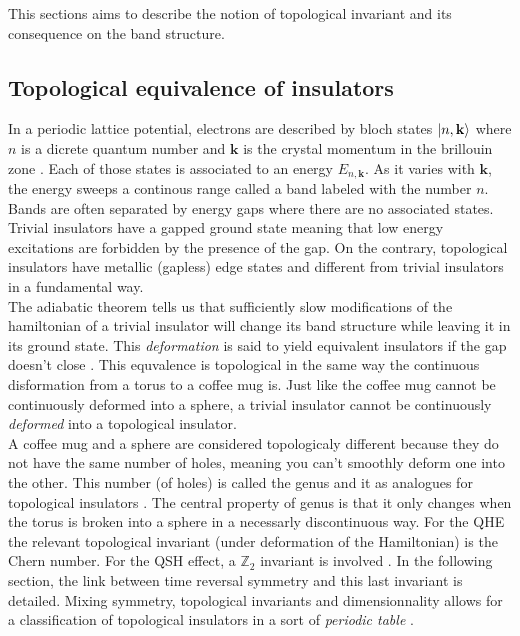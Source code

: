 This sections aims to describe the notion of topological invariant and its consequence on the band structure. 
\subsection{Topological equivalence of insulators \label{subsec:Top_Band}}
In a periodic lattice potential, electrons are described by bloch states $\ket{n, \mathbf{k}}$ where $n$ is a dicrete quantum number and $\mathbf{k}$ is the crystal momentum in the brillouin zone \cite{girvin_modern_2019}. Each of those states is associated to an energy $E_{n, \mathbf{k}}$.  As it varies with $\mathbf{k}$, the energy sweeps a continous range called a band labeled with the number $n$. Bands are often separated by energy gaps where there are no associated states. Trivial insulators have a gapped ground state meaning that low energy excitations are forbidden by the presence of the gap. On the contrary, topological insulators have metallic (gapless) edge states\cite{kane_topological_2013} and different from trivial insulators in a fundamental way.\\ 


The adiabatic theorem tells us that sufficiently slow modifications of the hamiltonian of a trivial insulator will change its band structure while leaving it in its ground state\cite{born_beweis_1928}. This \textit{deformation} is said to yield equivalent insulators if the gap doesn't close \cite{kane_topological_2013}. This equvalence is topological in the same way the continuous disformation from a torus to a coffee mug is. Just like the coffee mug cannot be continuously deformed into a sphere, a trivial insulator cannot be continuously \textit{deformed} into a topological insulator.\\

A coffee mug and a sphere are considered topologicaly different because they do not have the same number of holes, meaning you can't smoothly deform one into the other. 
This number (of holes) is called the genus and it as analogues for topological insulators \cite{batra_physics_2020}. The central property of genus is that it only changes when the torus is broken into a sphere in a necessarly discontinuous way. %
For the QHE the relevant topological invariant %
(under deformation of the Hamiltonian) is the Chern number. For the QSH effect, a $\mathbb{Z}_2$ invariant is involved \cite{kane_topological_2013}. In the following section, the link between time reversal symmetry and this last invariant is detailed.  Mixing symmetry, topological invariants and dimensionnality allows for a classification of topological insulators in a sort of \textit{periodic table} \cite{hasan_topological_2010}. 

